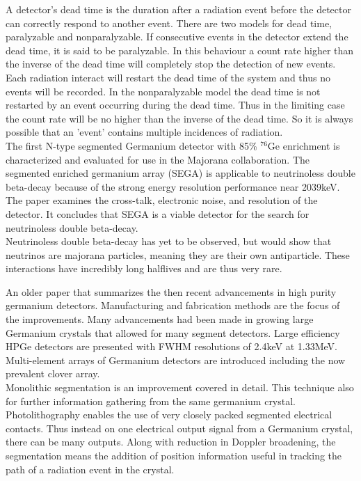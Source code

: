 \documentclass[12pt]{article}
\begin{document}
\begin{doublespacing}
A detector's dead time is the duration after a radiation event before the detector can correctly respond to another event.
There are two models for dead time, paralyzable and nonparalyzable. 
If consecutive events in the detector extend the dead time, it is said to be paralyzable. 
In this behaviour a count rate higher than the inverse of the dead time will completely stop the detection of new events. 
Each radiation interact will restart the dead time of the system and thus no events will be recorded. 
In the nonparalyzable model the dead time is not restarted by an event occurring during the dead time. 
Thus in the limiting case the count rate will be no higher than the inverse of the dead time.
So it is always possible that an 'event' contains multiple incidences of radiation.
\\



{\large\textbf{\cite{Leviner201466}}}
The first N-type segmented Germanium detector with 85\% $^{76}\mbox{Ge}$ enrichment is characterized and evaluated for use in the Majorana collaboration.
The segmented enriched germanium array (SEGA) is applicable to neutrinoless double beta-decay because of the strong energy resolution performance near 2039keV.
The paper examines the cross-talk, electronic noise, and resolution of the detector.
It concludes that SEGA is a viable detector for the search for neutrinoless double beta-decay.
\\

Neutrinoless double beta-decay has yet to be observed, but would show that neutrinos are majorana particles, meaning they are their own antiparticle.
These interactions have incredibly long halflives and are thus very rare.


{\large\textbf{\cite{Sangsingkeow2003183}}}
An older paper that summarizes the then recent advancements in high purity germanium detectors.
Manufacturing and fabrication methods are the focus of the improvements.
Many advancements had been made in growing large Germanium crystals that allowed for many segment detectors.
Large efficiency HPGe detectors are presented with FWHM resolutions of 2.4keV at 1.33MeV.
Multi-element arrays of Germanium detectors are introduced including the now prevalent clover array.
\\

Monolithic segmentation is an improvement covered in detail.
This technique also for further information gathering from the same germanium crystal.
Photolithography enables the use of very closely packed segmented electrical contacts.
Thus instead on one electrical output signal from a Germanium crystal, there can be many outputs.
Along with reduction in Doppler broadening, the segmentation means the addition of position information useful in tracking the path of a radiation event in the crystal.



\end{doublespacing}
\end{document}
